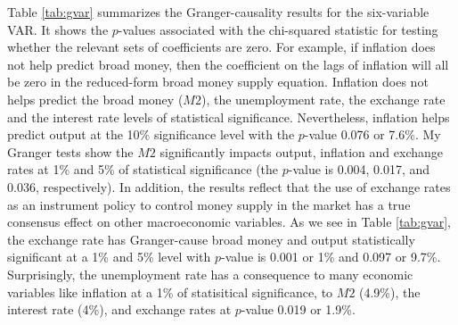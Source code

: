 \documentclass[11pt]{article}
\newif\ifstickappendix
\newcommand{\AppendixName}{appendix.tex}
\newcommand*{\RefsPath}{../references}
\newcommand*{\RefsPath}{docs/references}
\begin{document}
Table \ref{tab:gvar} summarizes the Granger-causality results for the six-variable VAR. It shows the $p$-values associated with the chi-squared statistic for testing whether the relevant sets of coefficients are zero. For example, if inflation does not help predict broad money, then the coefficient on the lags of inflation will all be zero in the reduced-form broad money supply equation. Inflation does not helps predict the broad money ($M2$), the unemployment rate, the exchange rate and the interest rate levels of statistical significance. Nevertheless, inflation helps predict output at the 10\% significance level with the $p$-value 0.076 or 7.6\%. My Granger tests show the $M2$ significantly impacts output, inflation and exchange rates at 1\% and 5\% of statistical significance (the $p$-value is 0.004, 0.017, and 0.036, respectively). In addition, the results reflect that the use of exchange rates as an instrument policy to control money supply in the market has a true consensus effect on other macroeconomic variables. As we see in Table \ref{tab:gvar}, the exchange rate has Granger-cause broad money and output statistically significant at a 1\% and 5\% level with $p$-value is 0.001 or 1\% and 0.097 or 9.7\%. Surprisingly, the unemployment rate has a consequence to many economic variables like inflation at a 1\% of statisitical significance, to $M2$ (4.9\%), the interest rate (4\%), and exchange rates at $p$-value 0.019 or 1.9\%.


\clearpage\newpage

%

\clearpage

\ifstickappendix
  \processdelayedfloats
  
\fi

\end{document}
